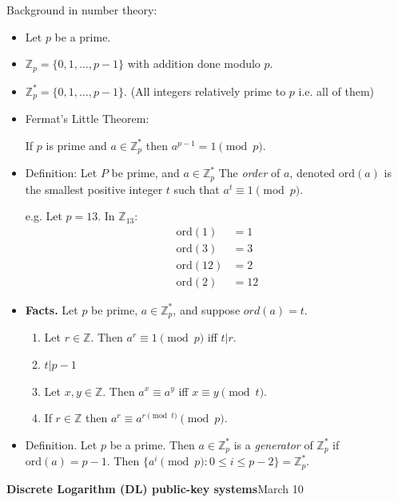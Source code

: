\documentclass[a4paper,12pt]{article}
\begin{document}
Background in number theory:
\begin{itemize}
  \item
  Let $p$ be a prime.
  \item
  $\mathbb{Z}_p = \{ 0,1,\ldots, p-1\}$ with addition
  done modulo $p$.
  \item
  $\mathbb{Z}_p^* = \{0,1,\ldots,p-1\}$. (All integers
  relatively prime to $p$ i.e. all of them)
  \item
  Fermat's Little Theorem:
  
  If $p$ is prime and $a\in \mathbb{Z}_p^*$ then
  $a^{p-1} = 1 \pmod p$.
  \item
  Definition: Let $P$ be prime, and $a\in\mathbb{Z}^*_p$
  The {\it order} of $a$, denoted $\text{ord}(a)$ is the
  smallest positive integer $t$ such that
  $a^t\equiv 1 \pmod p$.
  
  e.g. Let $p=13.$  In $\mathbb{Z}_{13}:$
  \begin{align*}
   \text{ord}(1)&=1\\
   \text{ord}(3)&=3\\
   \text{ord}(12)&=2\\
   \text{ord}(2)&=12
  \end{align*}
  \item
  {\bf Facts.}
  Let $p$ be prime, $a\in\mathbb{Z}_p^*$, and suppose
  $ord(a)=t.$
  \begin{enumerate}
   \item Let $r\in \mathbb{Z}.$ Then $a^r \equiv 1 \pmod p$
   iff $t|r$.
   \item
   $t|p-1$
   \item
   Let $x,y\in\mathbb{Z}$.  Then $a^x\equiv a^y$ iff
   $x\equiv y \pmod t$.
   \item
   If $r\in\mathbb{Z}$ then $a^r\equiv a^{r\pmod t} \pmod p$.
  \end{enumerate}
\item
Definition.  Let $p$ be a prime.
Then $a\in\mathbb{Z}_p^*$ is
a {\it generator} of $\mathbb{Z}_p^*$ if $\text{ord}(a)=p-1$.  
Then $\{a^i \pmod p : 0\le i \le p-2\} = \mathbb{Z}_p^*$.
\end{itemize}
\clearpage

{\bf Discrete Logarithm (DL) public-key systems}\hfill March 10
\end{document}
